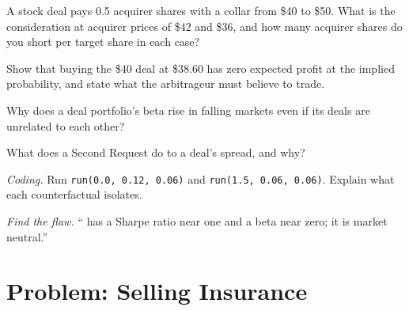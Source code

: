\begin{exercise}[$\star$]\label{exo:s1:merger-arbitrage:3}
A stock deal pays 0.5 acquirer shares with a collar from \$40 to \$50. What is the consideration at acquirer prices of \$42 and \$36, and how many acquirer
shares do you short per target share in each case?
\end{exercise}

\begin{exercise}[$\star\star$]\label{exo:s1:merger-arbitrage:4}
Show that buying the \$40 deal at \$38.60 has zero expected profit at the implied probability, and state what the arbitrageur must believe to trade.
\end{exercise}

\begin{exercise}[$\star\star$]\label{exo:s1:merger-arbitrage:5}
Why does a deal portfolio's beta rise in falling markets even if its deals are unrelated to each other?
\end{exercise}

\begin{exercise}[$\star\star$]\label{exo:s1:merger-arbitrage:6}
What does a Second Request do to a deal's spread, and why?
\end{exercise}

\begin{exercise}[$\star\star\star$]\label{exo:s1:merger-arbitrage:7}
\emph{Coding.} Run \texttt{run(0.0, 0.12, 0.06)} and \texttt{run(1.5, 0.06, 0.06)}. Explain what each counterfactual isolates.
\end{exercise}

\begin{exercise}[$\star\star\star$]\label{exo:s1:merger-arbitrage:8}
\emph{Find the flaw.} `` has a Sharpe ratio near one and a beta near zero; it is market neutral.''
\end{exercise}

\section{Problem: Selling Insurance}

